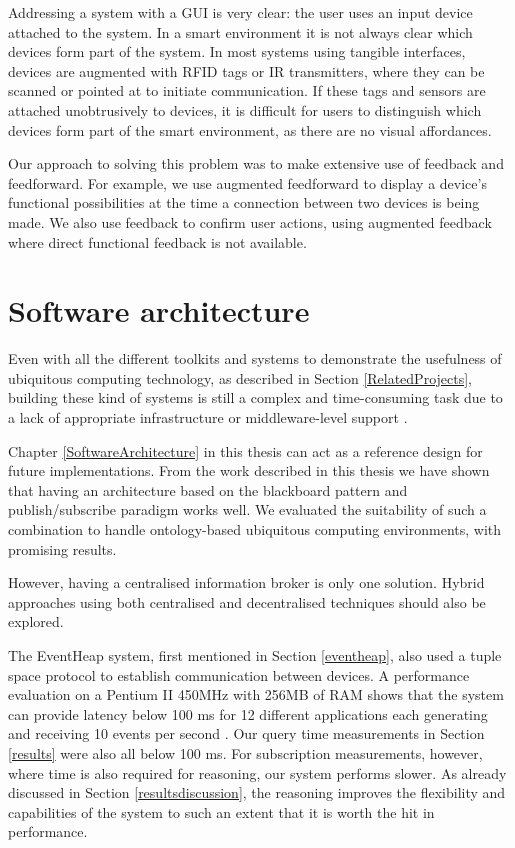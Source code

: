  Addressing a system with a \ac{GUI} is very clear: the user uses an input device attached to the system. In a smart environment it is not always clear which devices form part of the system. In most systems using tangible interfaces, devices are augmented with \ac{RFID} tags or IR transmitters, where they can be scanned or pointed at to initiate communication. If these tags and sensors are attached unobtrusively to devices, it is difficult for users to distinguish which devices form part of the smart environment, as there are no visual affordances. 
	
 Our approach to solving this problem was to make extensive use of feedback and feedforward. For example, we use augmented feedforward to display a device's functional possibilities at the time a connection between two devices is being made. We also use feedback to confirm user actions, using augmented feedback where direct functional feedback is not available.


\section{Software architecture}

Even with all the different toolkits and systems to demonstrate the usefulness of ubiquitous computing technology, as described in Section \ref{RelatedProjects}, building these kind of systems is still a complex and time-consuming task due to a lack of appropriate infrastructure or middle\-ware-level support \cite{Gu2004}.

Chapter \ref{SoftwareArchitecture} in this thesis can act as a reference design for future implementations. From the work described in this thesis we have shown that having an architecture based on the blackboard pattern and publish/subscribe paradigm works well. We evaluated the suitability of such a combination to handle on\-tol\-o\-gy-based ubiquitous computing environments, with promising results.%

However, having a centralised information broker is only one solution. Hybrid approaches using both centralised and decentralised techniques should also be explored.   

The EventHeap system, first mentioned in Section \ref{eventheap}, also used a tuple space protocol to establish communication between devices. A performance evaluation on a Pentium II 450MHz with 256MB of RAM shows that the system can provide latency below 100 ms for 12 different applications each generating and receiving 10 events per second \cite{Johanson2002}. Our query time measurements in Section \ref{results} were also all below 100 ms. For subscription measurements, however, where time is also required for reasoning, our system performs slower. As already discussed in Section \ref{resultsdiscussion}, the reasoning improves the flexibility and capabilities of the system to such an extent that it is worth the hit in performance.

